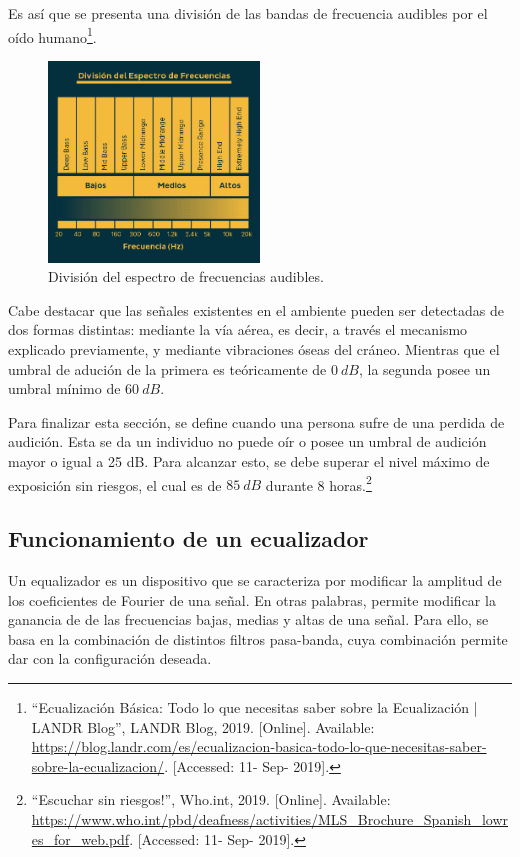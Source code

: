 Es así que se presenta una división de las bandas de frecuencia audibles por el oído humano\footnote{``Ecualización Básica: Todo lo que necesitas saber sobre la Ecualización | LANDR Blog'', LANDR Blog, 2019. [Online]. Available: \url{https://blog.landr.com/es/ecualizacion-basica-todo-lo-que-necesitas-saber-sobre-la-ecualizacion/}. [Accessed: 11- Sep- 2019].}.
\begin{figure}[H]
\centering
	\includegraphics[width=0.5\textwidth]{Imagenes/FrequencySpectrumDivision.png}
	\caption{División del espectro de frecuencias audibles.}
	\label{fig:divfreq}
\end{figure}

Cabe destacar que las señales existentes en el ambiente pueden ser detectadas de dos formas distintas: mediante la vía aérea, es decir, a través el mecanismo explicado previamente, y mediante vibraciones óseas del cráneo. Mientras que el umbral de adución de la primera es teóricamente de $0 \ dB$, la segunda posee un umbral mínimo de $60 \ dB$. 

Para finalizar esta sección, se define cuando una persona sufre de una perdida de audición. Esta se da un individuo no puede oír o posee un umbral de audición mayor o igual a 25 dB. Para alcanzar esto, se debe superar el nivel máximo de exposición sin riesgos, el cual es de $85 \ dB$ durante 8 horas.\footnote{``Escuchar sin riesgos!'', Who.int, 2019. [Online]. Available: \url{https://www.who.int/pbd/deafness/activities/MLS_Brochure_Spanish_lowres_for_web.pdf}. [Accessed: 11- Sep- 2019].}

\subsection{Funcionamiento de un ecualizador}

Un equalizador es un dispositivo que se caracteriza por modificar la amplitud de los coeficientes de Fourier de una señal. En otras palabras, permite modificar la ganancia de de las frecuencias bajas, medias y altas de una señal. Para ello, se basa en la combinación de distintos filtros pasa-banda, cuya combinación permite dar con la configuración deseada.

